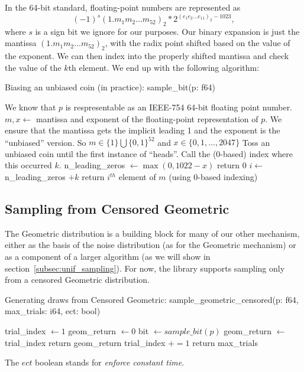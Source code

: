 \documentclass[11pt]{scrartcl} %
\begin{document}
In the 64-bit standard, floating-point numbers are represented as
\[ (-1)^s(1.m_1m_2 \hdots m_{52})_2 * 2^{(e_{1}e_2 \hdots e_{11})_2 - 1023}, \]
where $s$ is a sign bit we ignore for our purposes.
Our binary expansion is just the mantissa $(1.m_1m_2 \hdots m_{52})_2$, with
the radix point shifted based on the value of the exponent.
We can then index into the properly shifted mantissa and check the value of the $k$th element.
We end up with the following algorithm:
\begin{algorithm}[H]
	\caption{Biasing an unbiased coin (in practice): \newline sample\_bit(p: f64)}
	\label{alg:biasing_a_coin_practice}
	\begin{algorithmic}[1]
		\State We know that $p$ is respresentable as an IEEE-754 64-bit floating point number.
		\State $m, x \gets $ mantissa and exponent of the floating-point representation of $p$. 
		We ensure that the mantissa gets the implicit leading 1 and the exponent is the ``unbiased'' version.
		So $m \in \{1\} \bigcup \{0, 1\}^{52}$ and $x \in \{0, 1, \hdots, 2047\}$
		\State Toss an unbiased coin until the first instance of ``heads''. Call the (0-based) index where this occurred $k$.
		\State n\_leading\_zeros $\gets \max(0, 1022 - x)$
			\State return 0
		\Else
			\State $i \gets$ n\_leading\_zeros $+ k$
			\State return $i^{th}$ element of $m$ (using 0-based indexing)
		\EndIf
	\end{algorithmic}
\end{algorithm}

\subsection{Sampling from Censored Geometric}
The Geometric distribution is a building block for many of our other mechanism, either as the basis of the 
noise distribution (as for the Geometric mechanism) or as a component of a larger algorithm (as we will show in 
section~\ref{subsec:unif_sampling}). For now, the library supports sampling only from a censored Geometric distribution. 
\begin{algorithm}[H]
	\caption{Generating draws from Censored Geometric: \newline sample\_geometric\_censored(p: f64, max\_trials: i64, ect: bool)}
	\label{alg:censored_geom_p}
	\begin{algorithmic}[1]
		\State trial\_index $\gets 1$
		\State geom\_return $\gets 0$
			\State bit $\gets sample\_bit(p)$
				 
					\State geom\_return $\gets$ trial\_index
						\State return geom\_return
					\EndIf
				\EndIf
			\State trial\_index $+= 1$
			\EndIf
		\EndWhile
		 
			\State return max\_trials 
		\EndIf
	\end{algorithmic}
\end{algorithm}
The $ect$ boolean stands for \emph{enforce constant time}. 
\end{document}

